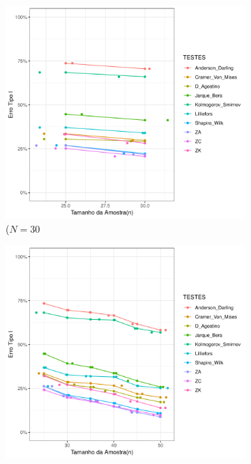 \documentclass[final]{beamer}
\begin{document}
\begin{frame}[t]
\begin{columns}[t,totalwidth=0.6\paperwidth]
\begin{column}{0.45\textwidth}
\begin{figure}[H]
    \centering
    \begin{subfigure}[b]{0.3\textwidth}
        \centering
        \includegraphics[width=\textwidth]{Distribuição_Beta/Erro_TipoI/erro_tipo_I_beta_30.pdf}
        \caption{(\(N = 30\)}
        \label{fig:beta_30}
    \end{subfigure}
    \hfill
    \begin{subfigure}[b]{0.3\textwidth}
        \centering
        \includegraphics[width=\textwidth]{Distribuição_Beta/Erro_TipoI/erro_tipo_I_beta_50.pdf}

\end{subfigure}
\end{figure}
\end{column}
\end{columns}
\end{frame}
\end{document}
